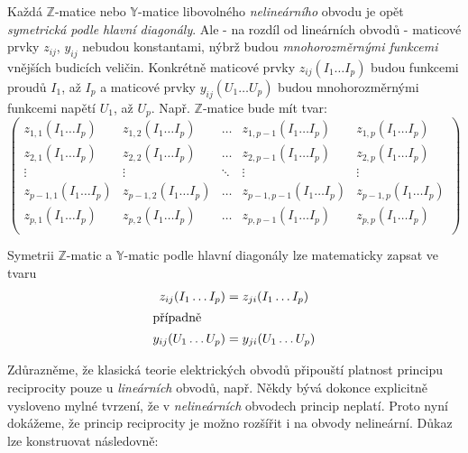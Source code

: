       Každá \(\mathbb{Z}\)-matice nebo \(\mathbb{Y}\)-matice libovolného \emph{nelineárního} obvodu 
      je opět \emph{symetrická podle hlavní diagonály}. Ale - na rozdíl od lineárních obvodů - 
      maticové prvky \(z_{ij}\), \(y_{ij}\) nebudou konstantami, nýbrž budou \emph{mnohorozměrnými 
      funkcemi} vnějších budicích veličin. Konkrétně maticové prvky \(z_{ij}(I_1\ldots I_p)\) budou 
      funkcemi proudů \(I_1\), až \(I_p\) a maticové prvky \(y_{ij}(U_1\ldots U_p)\) budou 
      mnohorozměrnými funkcemi napětí \(U_1\), až \(U_p\). Např. \(\mathbb{Z}\)-matice bude mít 
      tvar:
        \begin{equation*}
          \left(
            \begin{array}{ccccc}
              z_{1,1}(I_1\ldots I_p)     &  z_{1,2}(I_1\ldots I_p)   & \ldots & 
              z_{1,p-1}(I_1\ldots I_p)   &  z_{1,p}(I_1\ldots I_p)                   \\
              z_{2,1}(I_1\ldots I_p)     &  z_{2,2}(I_1\ldots I_p)   & \ldots & 
              z_{2,p-1}(I_1\ldots I_p)   &  z_{2,p}(I_1\ldots I_p)                   \\
              \vdots      &  \vdots      &  \ddots     & \vdots      & \vdots        \\
              z_{p-1,1}(I_1\ldots I_p)   &  z_{p-1,2}(I_1\ldots I_p) & \ldots & 
              z_{p-1,p-1}(I_1\ldots I_p) &  z_{p-1,p}(I_1\ldots I_p)                 \\
              z_{p,1}(I_1\ldots I_p)     &  z_{p,2}(I_1\ldots I_p)   & \ldots & 
              z_{p,p-1}(I_1\ldots I_p)   &  z_{p,p}(I_1\ldots I_p)                   \\
            \end{array}
          \right)
        \end{equation*}
      
      Symetrii \(\mathbb{Z}\)-matic a \(\mathbb{Y}\)-matic podle hlavní diagonály lze matematicky 
      zapsat ve tvaru
      \begin{subequations}
        \begin{align}\label{ES:eq_topol06}
          z_{ij}(I_1\ldots I_p) &= z_{ji}(I_1\ldots I_p) \\
          \shortintertext{případně}
          y_{ij}(U_1\ldots U_p) &= y_{ji}(U_1\ldots U_p)
        \end{align}
      \end{subequations}
      
      Zdůrazněme, že klasická teorie elektrických obvodů připouští platnost principu reciprocity 
      pouze u \emph{lineárních} obvodů, např. Někdy bývá dokonce explicitně vysloveno mylné 
      tvrzení, že v \emph{nelineárních} obvodech princip neplatí. Proto nyní dokážeme, že princip 
      reciprocity je možno rozšířit i na obvody nelineární. Důkaz lze konstruovat následovně:
     
